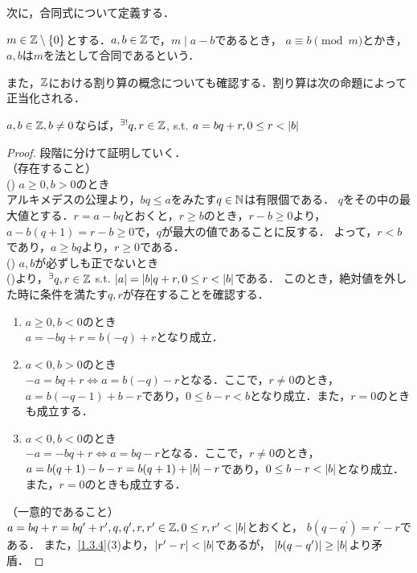     次に，合同式について定義する．

    \begin{dfn} \label{1.4.12}
      $m \in \mathbb{Z} \setminus \lbrace0\rbrace$とする．$a, b \in \mathbb{Z}$で，$m \mid a-b$であるとき，
      $a \equiv b \pmod m$とかき，$a,b$は$m$を法として合同であるという．
    \end{dfn}

    また，$\mathbb{Z}$における割り算の概念についても確認する．割り算は次の命題によって正当化される．

    \begin{prop} \label{1.4.15}
      $a, b \in \mathbb{Z}, b \neq 0$ならば，$^{\exists !}q,r \in \mathbb{Z}$, s.t. $a=bq+r, 0 \leq r < \lvert b\rvert$
    \end{prop}

    \begin{proof}
      段階に分けて証明していく． \\
      （存在すること） \\
      () $a \geq 0, b > 0$のとき \\
      アルキメデスの公理より，$bq \leq a$をみたす$q \in \mathbb{N}$は有限個である．
      $q$をその中の最大値とする．$r = a-bq$とおくと，$r \geq b$のとき，$r-b \geq 0$より，
      $a-b(q+1) = r - b \geq 0$で，$q$が最大の値であることに反する．
      よって，$r < b$であり，$a \geq bq$より，$r \geq 0$である．\\
      () $a,b$が必ずしも正でないとき \\
      ()より，$^{\exists}q,r \in \mathbb{Z}$ s.t. $\lvert a\rvert = \lvert b\rvert q + r, 0 \leq r < \lvert b\rvert$である．
      このとき，絶対値を外した時に条件を満たす$q,r$が存在することを確認する．
      \begin{enumerate}
        \item $a \geq 0, b < 0$のとき\\
        $a = -bq + r = b(-q) + r$となり成立．
        \item $a < 0, b > 0$のとき\\
        $-a = bq + r \iff a = b(-q)-r$となる．ここで，$r \neq 0$のとき，
        $a = b(-q-1) + b-r$であり，$0 \leq b-r < b$となり成立．また，$r = 0$のときも成立する．
        \item $a < 0, b < 0のとき$\\
        $-a = -bq + r \iff a = bq - r$となる．ここで，$r \neq 0$のとき，
        $a = b(q+1)-b-r = b(q+1) + \lvert b\rvert - r$であり，$0 \leq b-r < \lvert b\rvert$となり成立．また，$r = 0$のときも成立する．
      \end{enumerate}
      （一意的であること）\\
      $a = bq + r = bq^{\prime}+r^{\prime}, q, q^{\prime}, r, r^{\prime} \in \mathbb{Z}, 0 \leq r, r^{\prime} < \lvert b\rvert$とおくと，
      $b(q-q^{\prime}) = r^{\prime} - r$である．
      また，\cref{1.3.4}(3)より，$\lvert r^{\prime} - r\rvert < \lvert b\rvert$であるが，
      $\lvert b(q-q^{\prime})\rvert \geq \lvert b\rvert$より矛盾．
    \end{proof}

